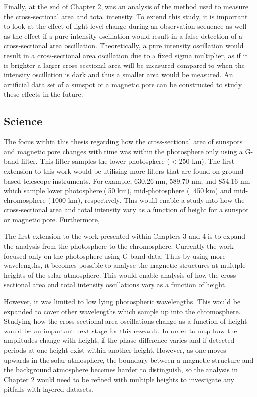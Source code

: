     Finally, at the end of Chapter 2, was an analysis of the method used to measure the cross-sectional area and total intensity.
    To extend this study, it is important to look at the effect of light level change during an observation sequence as well as the effect if a pure intensity oscillation would result in a false detection of a cross-sectional area oscillation. 
    Theoretically, a pure intensity oscillation would result in a cross-sectional area oscillation due to a fixed sigma multiplier, as if it is brighter a larger cross-sectional area will be measured compared to when the intensity oscillation is dark and thus a smaller area would be measured.
    An artificial data set of a sunspot or a magnetic pore can be constructed to study these effects in the future.  
                
    \subsection{Science}
 
    The focus within this thesis regarding how the cross-sectional area of sunspots and magnetic pore changes with time was within the photosphere only using a G-band filter.
    This filter samples the lower photosphere ($<$250 km).
    The first extension to this work would be utilising more filters that are found on ground-based telescope instruments.
    For example,  630.26 nm,  589.70 nm, and  854.16 nm which sample lower photosphere ($~$50 km), mid-photosphere ($~$ 450 km) and mid-chromosphere ($~$1000 km), respectively.
    This would enable a study into how the cross-sectional area and total intensity vary as a function of height for a sunspot or magnetic pore. 
    Furthermore, 
    
The first extension to the work presented within Chapters 3 and 4 is to expand the analysis from the photosphere to the chromosphere.
Currently the work focused only on the photosphere using G-band data.
Thus by using more wavelengths, it becomes possible to analyse the magnetic structures at multiple heights of the solar atmosphere.
This would enable analysis of how the cross-sectional area and total intensity oscillations vary as a function of height.

However, it was limited to low lying photospheric wavelengths.
This would be expanded to cover other wavelengths which sample up into the chromosphere. 
Studying how the cross-sectional area oscillations change as a function of height would be an important next stage for this research.
In order to map how the amplitudes change with height, if the phase difference varies and if detected periods at one height exist within another height.
However, as one moves upwards in the solar atmosphere, the boundary between a magnetic structure and the background atmosphere becomes harder to distinguish, so the analysis in Chapter 2 would need to be refined with multiple heights to investigate any pitfalls with layered datasets.

